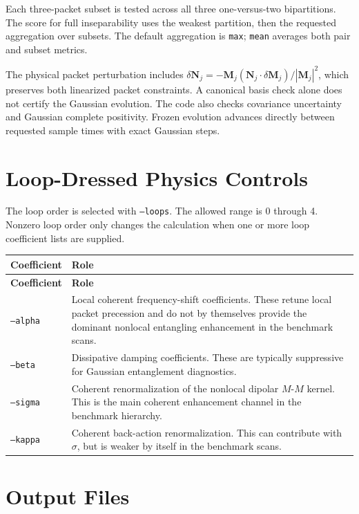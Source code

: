 \documentclass[11pt]{article}
\begin{document}
Each three-packet subset is tested across all three one-versus-two
bipartitions. The score for full inseparability uses the weakest partition, then
the requested aggregation over subsets. The default aggregation is
\texttt{max}; \texttt{mean} averages both pair and subset metrics.

The physical packet perturbation includes
\(\delta\mathbf N_j=-\mathbf M_j(\mathbf N_j\cdot\delta\mathbf M_j)/|\mathbf M_j|^2\),
which preserves both linearized packet constraints. A canonical basis check
alone does not certify the Gaussian evolution. The code also checks covariance
uncertainty and Gaussian complete positivity. Frozen evolution advances
directly between requested sample times with exact Gaussian steps.

\section{Loop-Dressed Physics Controls}
The loop order is selected with \texttt{--loops}. The allowed range is 0 through
4. Nonzero loop order only changes the calculation when one or more loop
coefficient lists are supplied.

\begin{longtable}{L{0.20\textwidth}L{0.72\textwidth}}
\toprule
\textbf{Coefficient} & \textbf{Role} \\
\midrule
\endfirsthead
\toprule
\textbf{Coefficient} & \textbf{Role} \\
\midrule
\endhead
\texttt{--alpha} & Local coherent frequency-shift coefficients. These retune local packet precession and do not by themselves provide the dominant nonlocal entangling enhancement in the benchmark scans. \\
\texttt{--beta} & Dissipative damping coefficients. These are typically suppressive for Gaussian entanglement diagnostics. \\
\texttt{--sigma} & Coherent renormalization of the nonlocal dipolar \(M\)-\(M\) kernel. This is the main coherent enhancement channel in the benchmark hierarchy. \\
\texttt{--kappa} & Coherent back-action renormalization. This can contribute with \(\sigma\), but is weaker by itself in the benchmark scans. \\
\bottomrule
\end{longtable}

\section{Output Files}
\end{document}
